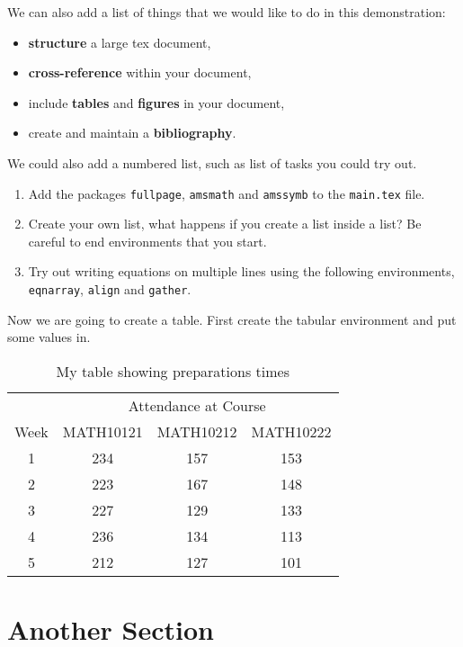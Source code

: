 We can also add a list of things that we would like to do in this demonstration:
\begin{itemize}
    \item \textbf{structure} a large tex document,
    \item \textbf{cross-reference} within your document,
    \item include \textbf{tables} and \textbf{figures} in your document,
    \item create and maintain a \textbf{bibliography}.
\end{itemize}
We could also add a numbered list, such as list of tasks you could try out.
\begin{enumerate}
    \item Add the packages \texttt{fullpage}, \texttt{amsmath} and  \texttt{amssymb} to the \texttt{main.tex} file.
    \item Create your own list, what happens if you create a list inside a list? Be careful to end environments that you start.
    \item Try out writing equations on multiple lines using the following environments, \texttt{eqnarray}, \texttt{align} and \texttt{gather}.
\end{enumerate}


Now we are going to create a table. First create the tabular environment and put some values in.

\begin{table}
    \begin{center} %
        \begin{tabular}{c|ccc}
            & \multicolumn{3}{c}{Attendance at Course} \\
            Week & MATH10121 & MATH10212 & MATH10222 \\
            \hline
            1 & 234 & 157 & 153 \\
            2 & 223 & 167 & 148 \\
            3 & 227 & 129 & 133 \\
            4 & 236 & 134 & 113 \\
            5 & 212 & 127 & 101
        \end{tabular}
        \caption{My table showing preparations times} %
        \label{tab:myTable}
    \end{center}
\end{table}

\section{Another Section}

